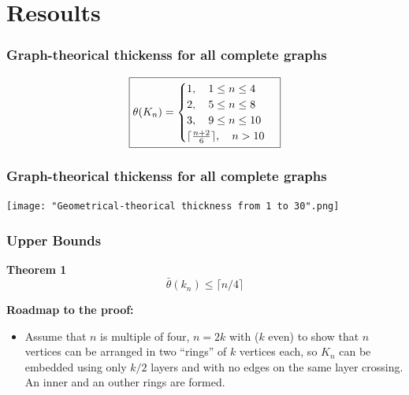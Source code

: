 \documentclass[12 pt]{beamer}
\begin{document}
\section{Resoults}

\begin{frame}{5}
    \frametitle{Graph-theorical thickenss for all complete graphs}
    
    $$
    \boxed{
    \theta (\mathnormal{K}_{n}) = 
    \begin{cases}
    1, \quad 1 \leq n \leq 4\\
    2, \quad 5 \leq n \leq 8\\
    3, \quad 9 \leq n \leq 10\\
    \lceil \frac{n + 2}{6} \rceil, \quad n > 10\\
    \end{cases}
    }
    $$

\end{frame}

\begin{frame}{5}
    \frametitle{Graph-theorical thickenss for all complete graphs}
    
    \centering
    \texttt{[image: "Geometrical-theorical thickness from 1 to 30".png]}
    
\end{frame}


\begin{frame}{}
    \frametitle{Upper Bounds}
    
    \begin{block}{\textbf{Theorem 1}}
    $$\bar{\theta} (k_{n}) \leq \lceil n/4 \rceil $$
    \end{block}
    
    \pause
    
    \textbf{Roadmap to the proof:}
    
    \begin{itemize}
        \item Assume that $n$ is multiple of four, $n = 2k$ with ($k$ even) to show that $n$ vertices can be arranged in two ``rings'' of $k$ vertices each, so $K_{n}$ can be embedded using only $k/2$ layers and with no edges on the same layer crossing. An inner and an outher rings are formed.
    \end{itemize}
\end{frame}
\end{document}
